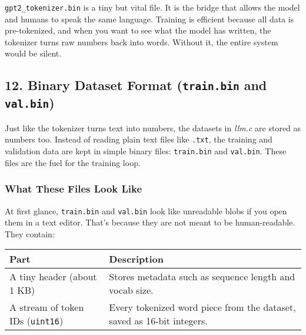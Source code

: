 \documentclass[
  letterpaper,
  DIV=11,
  numbers=noendperiod]{scrreprt}
\begin{document}
\texttt{gpt2\_tokenizer.bin} is a tiny but vital file. It is the bridge
that allows the model and humans to speak the same language. Training is
efficient because all data is pre-tokenized, and when you want to see
what the model has written, the tokenizer turns raw numbers back into
words. Without it, the entire system would be silent.

\subsection{\texorpdfstring{12. Binary Dataset Format
(\texttt{train.bin} and
\texttt{val.bin})}{12. Binary Dataset Format (train.bin and val.bin)}}\label{binary-dataset-format-train.bin-and-val.bin}

Just like the tokenizer turns text into numbers, the datasets in
\emph{llm.c} are stored as numbers too. Instead of reading plain text
files like \texttt{.txt}, the training and validation data are kept in
simple binary files: \texttt{train.bin} and \texttt{val.bin}. These
files are the fuel for the training loop.

\subsubsection{What These Files Look
Like}\label{what-these-files-look-like}

At first glance, \texttt{train.bin} and \texttt{val.bin} look like
unreadable blobs if you open them in a text editor. That's because they
are not meant to be human-readable. They contain:

\begin{longtable}[]{@{}
  >{\raggedright\arraybackslash}p{}
  >{\raggedright\arraybackslash}p{}@{}}
\toprule\noalign{}
\begin{minipage}[b]{\linewidth}\raggedright
Part
\end{minipage} & \begin{minipage}[b]{\linewidth}\raggedright
Description
\end{minipage} \\
\midrule\noalign{}
\endhead
\bottomrule\noalign{}
\endlastfoot
A tiny header (about 1 KB) & Stores metadata such as sequence length and
vocab size. \\
A stream of token IDs (\texttt{uint16}) & Every tokenized word piece
from the dataset, saved as 16-bit integers. \\
\end{longtable}
\end{document}
